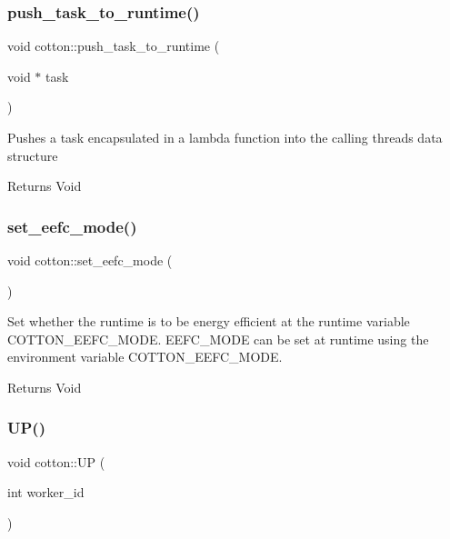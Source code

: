 \subsubsection{\texorpdfstring{push\+\_\+task\+\_\+to\+\_\+runtime()}{push\_task\_to\_runtime()}}
{\footnotesize\ttfamily void cotton\+::push\+\_\+task\+\_\+to\+\_\+runtime (\begin{DoxyParamCaption}\item[{void $\ast$}]{task }\end{DoxyParamCaption})}

Pushes a task encapsulated in a lambda function into the calling thread\textquotesingle{}s data structure

\begin{DoxyReturn}{Returns}
Void 
\end{DoxyReturn}
\mbox{\label{cotton-runtime_8h_file_aac28063e6fe138ec81c444e83b7f6ffc}} 
\subsubsection{\texorpdfstring{set\+\_\+eefc\+\_\+mode()}{set\_eefc\_mode()}}
{\footnotesize\ttfamily void cotton\+::set\+\_\+eefc\+\_\+mode (\begin{DoxyParamCaption}{ }\end{DoxyParamCaption})}

Set whether the runtime is to be energy efficient at the runtime variable {\ttfamily C\+O\+T\+T\+O\+N\+\_\+\+E\+E\+F\+C\+\_\+\+M\+O\+DE}. E\+E\+F\+C\+\_\+\+M\+O\+DE can be set at runtime using the environment variable C\+O\+T\+T\+O\+N\+\_\+\+E\+E\+F\+C\+\_\+\+M\+O\+DE.

\begin{DoxyReturn}{Returns}
Void 
\end{DoxyReturn}
\mbox{\label{cotton-runtime_8h_file_ae91d8cfb1b831a971eafccb512c17a15}} 
\subsubsection{\texorpdfstring{U\+P()}{UP()}}
{\footnotesize\ttfamily void cotton\+::\+UP (\begin{DoxyParamCaption}\item[{int}]{worker\+\_\+id }\end{DoxyParamCaption})}

